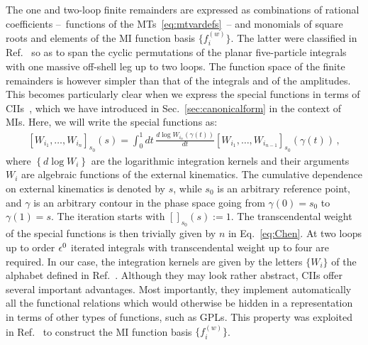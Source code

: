 \documentclass[main.tex]{subfiles}
\begin{document}
\label{Hbbsec:Hbasis}
The one and two-loop finite remainders are expressed as combinations of rational coefficients --~functions of the MTs~\ref{eq:mtvardefs}~-- and monomials of square roots and elements of the MI function basis $\{f^{(w)}_i\}$. The latter were classified in Ref.~\cite{Badger:2021nhg} so as to span the cyclic permutations of the planar five-particle integrals with one massive off-shell leg up to two loops. The function space of the finite remainders is however simpler than that of the integrals and of the amplitudes. This becomes particularly clear when we express the special functions in terms of CIIs~\cite{Chen:1977oja}, which we have introduced in Sec.~\ref{sec:canonicalform} in the context of MIs. Here, we will write the special functions as:
\begin{align} \label{eq:Chen}
\left[W_{i_1}, \ldots, W_{i_n}  \right]_{s_0} (s) = \int_0^1 dt \, \frac{d \log W_{i_n}\left(\gamma(t)\right)}{dt} \left[W_{i_1}, \ldots, W_{i_{n-1}}  \right]_{s_0} \left(\gamma(t)\right) \,,
\end{align}
where $\left\{ d\log W_i \right\}$ are the logarithmic integration kernels and their arguments $W_i$ are algebraic functions of the external kinematics. The cumulative dependence on external kinematics is denoted by $s$, while $s_0$ is an arbitrary reference point, and $\gamma$ is an arbitrary contour in the phase space going from $\gamma(0)=s_0$ to $\gamma(1)=s$. The iteration starts with $[]_{s_0}(s) := 1$. The transcendental weight of the special functions is then trivially given by $n$ in Eq.~\ref{eq:Chen}. At two loops up to order $\epsilon^0$ iterated integrals with transcendental weight up to four are required. In our case, the integration kernels are given by the letters $\{W_i\}$ of the alphabet defined in Ref.~\cite{Abreu:2020jxa}. 
Although they may look rather abstract, CIIs offer several important advantages. Most importantly, they implement automatically all the functional relations which would otherwise be hidden in a representation in terms of other types of functions, such as GPLs. This property was exploited in Ref.~\cite{Badger:2021nhg} to construct the MI function basis $\{f^{(w)}_i\}$. 
\end{document}

